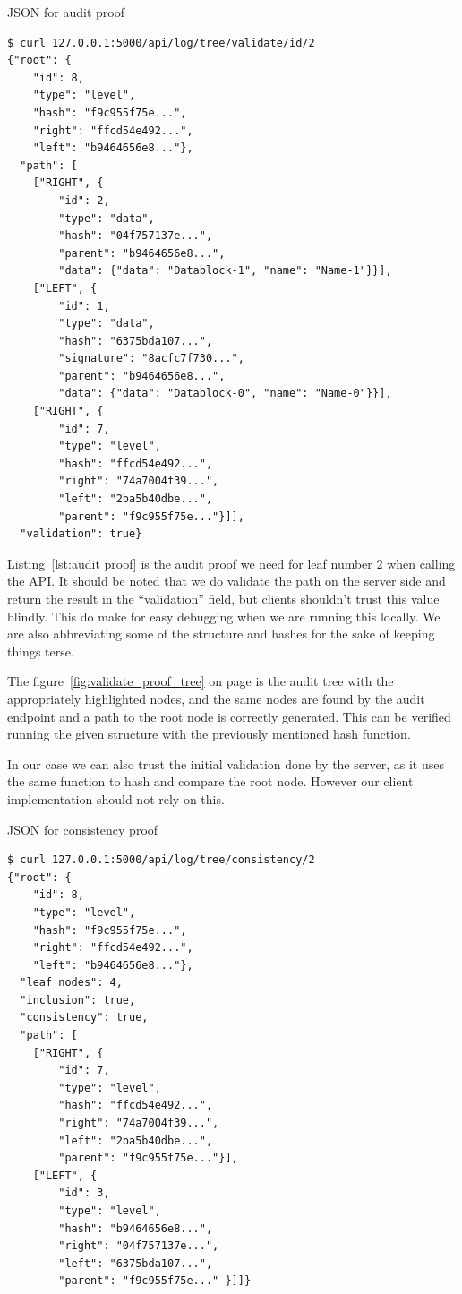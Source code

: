 \documentclass[../Main/thesis.tex]{subfiles}
\begin{document}
\begin{listing}[H]
\caption{JSON for audit proof}
\label{lst:audit proof}
\begin{verbatim}
$ curl 127.0.0.1:5000/api/log/tree/validate/id/2
{"root": {
    "id": 8,
    "type": "level",
    "hash": "f9c955f75e...",
    "right": "ffcd54e492...",
    "left": "b9464656e8..."},
  "path": [
    ["RIGHT", {
        "id": 2,
        "type": "data",
        "hash": "04f757137e...",
        "parent": "b9464656e8...",
        "data": {"data": "Datablock-1", "name": "Name-1"}}],
    ["LEFT", {
        "id": 1,
        "type": "data",
        "hash": "6375bda107...",
        "signature": "8acfc7f730...",
        "parent": "b9464656e8...",
        "data": {"data": "Datablock-0", "name": "Name-0"}}],
    ["RIGHT", {
        "id": 7,
        "type": "level",
        "hash": "ffcd54e492...",
        "right": "74a7004f39...",
        "left": "2ba5b40dbe...",
        "parent": "f9c955f75e..."}]],
  "validation": true}
\end{verbatim}
\end{listing}

Listing~\ref{lst:audit proof} is the audit proof we need for leaf number 2 when
calling the API. It should be noted that we do validate the path on the server
side and return the result in the ``validation'' field, but clients shouldn't
trust this value blindly. This do make for easy debugging when we are running
this locally. We are also abbreviating some of the structure and hashes for the
sake of keeping things terse.

The figure~\ref{fig:validate_proof_tree} on page
\pageref{fig:validate_proof_tree} is the audit tree with the appropriately
highlighted nodes, and the same nodes are found by the audit endpoint and a path
to the root node is correctly generated. This can be verified running the given
structure with the previously mentioned hash function.

In our case we can also trust the initial validation done by the server, as it
uses the same function to hash and compare the root node. However our client
implementation should not rely on this.


\begin{listing}[H]
\caption{JSON for consistency proof}
\label{lst:consistency proof}
\begin{verbatim}
$ curl 127.0.0.1:5000/api/log/tree/consistency/2
{"root": {
    "id": 8,
    "type": "level",
    "hash": "f9c955f75e...",
    "right": "ffcd54e492...",
    "left": "b9464656e8..."},
  "leaf nodes": 4,
  "inclusion": true,
  "consistency": true,
  "path": [
    ["RIGHT", {
        "id": 7,
        "type": "level",
        "hash": "ffcd54e492...",
        "right": "74a7004f39...",
        "left": "2ba5b40dbe...",
        "parent": "f9c955f75e..."}],
    ["LEFT", {
        "id": 3,
        "type": "level",
        "hash": "b9464656e8...",
        "right": "04f757137e...",
        "left": "6375bda107...",
        "parent": "f9c955f75e..." }]]}
\end{verbatim}
\end{listing}
\end{document}
